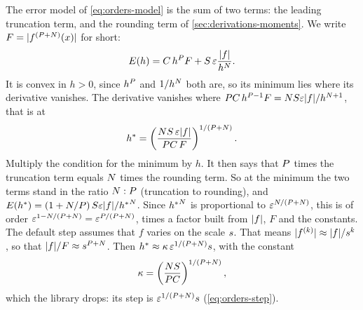 The error model of \cref{eq:orders-model} is the sum of two terms: the leading truncation term, and the rounding
term of \cref{sec:derivations-moments}. We write $F = \lvert f^{(P + N)}(x) \rvert$ for short:
\[
  E(h) = C\, h^{P} F + S\, \varepsilon \frac{\lvert f \rvert}{h^{N}} .
\]
It is convex in $h > 0$, since $h^{P}$ and $1/h^{N}$ both are, so its minimum lies where its derivative
vanishes. The derivative vanishes where
$P C\, h^{P - 1} F = N S \varepsilon \lvert f \rvert / h^{N + 1}$, that is at
\begin{equation}
  h^{\ast} = \left( \frac{N S\, \varepsilon \lvert f \rvert}{P C\, F} \right)^{1/(P + N)} .
  \label{eq:derivations-best-step}
\end{equation}
Multiply the condition for the minimum by $h$. It then says that $P$ times the truncation term equals
$N$ times the rounding term. So at the minimum the two terms stand in the ratio $N : P$
(truncation to rounding), and $E(h^{\ast}) = (1 + N / P)\, S \varepsilon \lvert f \rvert / {h^{\ast}}^{N}$.
Since ${h^{\ast}}^{N}$ is proportional to $\varepsilon^{N/(P + N)}$, this is of order
$\varepsilon^{1 - N/(P + N)} = \varepsilon^{P/(P + N)}$, times a factor built from
$\lvert f \rvert$, $F$ and the constants. The default step assumes that $f$ varies on the scale $s$. That means
$\lvert f^{(k)} \rvert \approx \lvert f \rvert / s^k$, so that $\lvert f \rvert / F \approx s^{P + N}$. Then
$h^{\ast} \approx \kappa\, \varepsilon^{1/(P + N)} s$, with the constant
\begin{equation}
  \kappa = \left( \frac{N S}{P C} \right)^{1/(P + N)},
  \label{eq:derivations-constant}
\end{equation}
which the library drops: its step is $\varepsilon^{1/(P + N)} s$ (\cref{eq:orders-step}).

